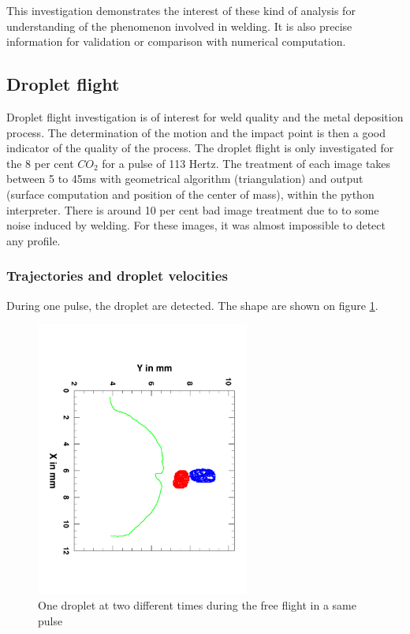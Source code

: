 \documentclass[12pt]{iopart}
\begin{document}
This investigation demonstrates the interest of these kind of analysis for understanding of the phenomenon
involved in welding. It is also precise information for validation or comparison with numerical
computation.


\subsection{ Droplet flight}
\label{ droplet_flight}

Droplet flight investigation is of interest for weld quality and the metal deposition process.
The determination of the motion and the impact point is then a good indicator of the quality of the
process. The droplet flight is only investigated for the 8 per cent $CO_2$ for a pulse of 113 Hertz.
The treatment of each image takes between 5 to 45ms with geometrical algorithm (triangulation) and output
(surface computation and position of the center of mass), within the python interpreter.
There is around  10 per cent bad image treatment  due to to some noise induced by welding. For these
images, it was almost impossible to detect any profile.



\subsubsection{Trajectories and droplet velocities}
\label{trajectories_and_droplet_velocities}

During one pulse, the droplet are detected. The shape are shown on figure \ref{fig::droplets}.

\begin{figure}[h!]
\centering    
\includegraphics[width=7cm,angle=90]{images/FreeFlight.pdf}
\caption{One droplet at two different times during the free flight in a same pulse}
\label{fig::droplets}
\end{figure}
\end{document}
